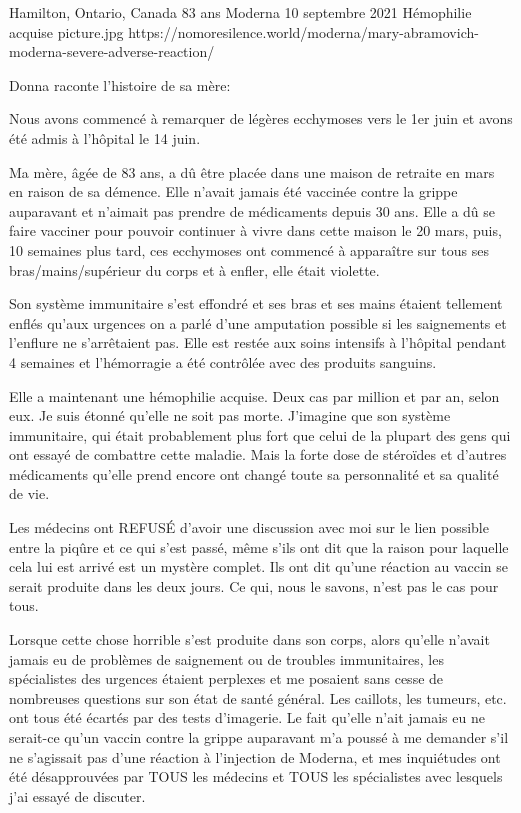           {Hamilton, Ontario, Canada}
          {83 ans}
          {Moderna}
          {10 septembre 2021}
          {Hémophilie acquise}
          {picture.jpg}
          {https://nomoresilence.world/moderna/mary-abramovich-moderna-severe-adverse-reaction/}
          {

\normalsize

Donna raconte l'histoire de sa mère:

Nous avons commencé à remarquer de légères ecchymoses vers le 1er juin et avons
été admis à l'hôpital le 14 juin.

Ma mère, âgée de 83 ans, a dû être placée dans une maison de retraite en mars en
raison de sa démence. Elle n'avait jamais été vaccinée contre la grippe
auparavant et n'aimait pas prendre de médicaments depuis 30 ans. Elle a dû se
faire vacciner pour pouvoir continuer à vivre dans cette maison le 20 mars,
puis, 10 semaines plus tard, ces ecchymoses ont commencé à apparaître sur tous
ses bras/mains/supérieur du corps et à enfler, elle était violette.

Son système immunitaire s'est effondré et ses bras et ses mains étaient
tellement enflés qu'aux urgences on a parlé d'une amputation possible si les
saignements et l'enflure ne s'arrêtaient pas. Elle est restée aux soins
intensifs à l'hôpital pendant 4 semaines et l'hémorragie a été contrôlée avec
des produits sanguins.

Elle a maintenant une hémophilie acquise. Deux cas par million et par an, selon
eux. Je suis étonné qu'elle ne soit pas morte. J'imagine que son système
immunitaire, qui était probablement plus fort que celui de la plupart des gens
qui ont essayé de combattre cette maladie. Mais la forte dose de stéroïdes et
d'autres médicaments qu'elle prend encore ont changé toute sa personnalité et sa
qualité de vie.

Les médecins ont REFUSÉ d'avoir une discussion avec moi sur le lien possible
entre la piqûre et ce qui s'est passé, même s'ils ont dit que la raison pour
laquelle cela lui est arrivé est un mystère complet. Ils ont dit qu'une réaction
au vaccin se serait produite dans les deux jours. Ce qui, nous le savons, n'est
pas le cas pour tous.

Lorsque cette chose horrible s'est produite dans son corps, alors qu'elle
n'avait jamais eu de problèmes de saignement ou de troubles immunitaires, les
spécialistes des urgences étaient perplexes et me posaient sans cesse de
nombreuses questions sur son état de santé général. Les caillots, les tumeurs,
etc. ont tous été écartés par des tests d'imagerie. Le fait qu'elle n'ait jamais
eu ne serait-ce qu'un vaccin contre la grippe auparavant m'a poussé à me
demander s'il ne s'agissait pas d'une réaction à l'injection de Moderna, et mes
inquiétudes ont été désapprouvées par TOUS les médecins et TOUS les spécialistes
avec lesquels j'ai essayé de discuter.

}
